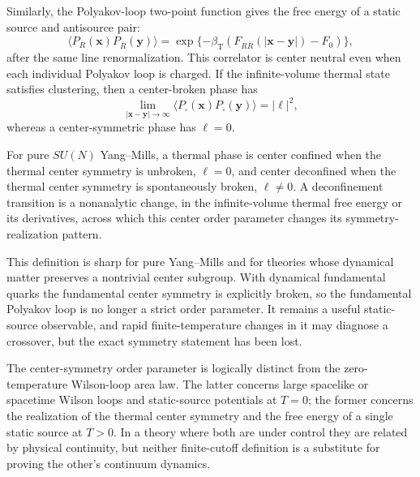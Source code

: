 Similarly, the Polyakov-loop two-point function gives the free energy of a
static source and antisource pair:
\begin{equation}
  \langle P_R(\mathbf x)P_{\overline R}(\mathbf y)\rangle
  =
  \exp\{-\beta_{\mathrm T}
  (F_{R\overline R}(|\mathbf x-\mathbf y|)-F_0)\},
  \label{eq:polyakov-loop-pair-free-energy}
\end{equation}
after the same line renormalization.  This correlator is center neutral even
when each individual Polyakov loop is charged.  If the infinite-volume
thermal state satisfies clustering, then a center-broken phase has
\begin{equation}
  \lim_{|\mathbf x-\mathbf y|\to\infty}
  \langle P_\square(\mathbf x)P_{\overline{\square}}(\mathbf y)\rangle
  =
  |\ell|^2 ,
  \label{eq:polyakov-clustering-broken-center}
\end{equation}
whereas a center-symmetric phase has \(\ell=0\).

\begin{definition}
\label{def:center-deconfinement}
For pure \(SU(N)\) Yang--Mills, a thermal phase is center confined when the
thermal center symmetry is unbroken, \(\ell=0\), and center deconfined when
the thermal center symmetry is spontaneously broken, \(\ell\neq0\).  A
deconfinement transition is a nonanalytic change, in the infinite-volume
thermal free energy or its derivatives, across which this center order
parameter changes its symmetry-realization pattern.
\end{definition}

This definition is sharp for pure Yang--Mills and for theories whose
dynamical matter preserves a nontrivial center subgroup.  With dynamical
fundamental quarks the fundamental center symmetry is explicitly broken, so
the fundamental Polyakov loop is no longer a strict order parameter.  It
remains a useful static-source observable, and rapid finite-temperature
changes in it may diagnose a crossover, but the exact symmetry statement has
been lost.

The center-symmetry order parameter is logically distinct from the
zero-temperature Wilson-loop area law.  The latter concerns large spacelike
or spacetime Wilson loops and static-source potentials at \(T=0\); the former
concerns the realization of the thermal center symmetry and the free energy
of a single static source at \(T>0\).  In a theory where both are under
control they are related by physical continuity, but neither finite-cutoff
definition is a substitute for proving the other's continuum dynamics.

